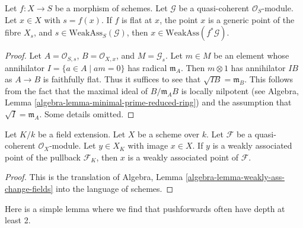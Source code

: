 \begin{lemma}
\label{lemma-weakly-ass-pullback}
Let $f : X \to S$ be a morphism of schemes. Let $\mathcal{G}$ be a
quasi-coherent $\mathcal{O}_S$-module. Let $x \in X$ with $s = f(x)$.
If $f$ is flat at $x$, the point $x$ is a generic point of the fibre $X_s$, and
$s \in \text{WeakAss}_S(\mathcal{G})$, then
$x \in \text{WeakAss}(f^*\mathcal{G})$.
\end{lemma}

\begin{proof}
Let $A = \mathcal{O}_{S, s}$, $B = \mathcal{O}_{X, x}$, and
$M = \mathcal{G}_s$. Let $m \in M$ be an element whose annihilator
$I = \{a \in A \mid am = 0\}$ has radical $\mathfrak m_A$. Then
$m \otimes 1$ has annihilator $I B$ as $A \to B$ is
faithfully flat. Thus it suffices to see that $\sqrt{I B} = \mathfrak m_B$.
This follows from the fact that the maximal ideal of $B/\mathfrak m_AB$
is locally nilpotent (see
Algebra, Lemma \ref{algebra-lemma-minimal-prime-reduced-ring})
and the assumption that $\sqrt{I} = \mathfrak m_A$.
Some details omitted.
\end{proof}

\begin{lemma}
\label{lemma-weakly-ass-change-fields}
Let $K/k$ be a field extension. Let $X$ be a scheme over $k$.
Let $\mathcal{F}$ be a quasi-coherent $\mathcal{O}_X$-module.
Let $y \in X_K$ with image $x \in X$. If $y$ is a weakly
associated point of the pullback $\mathcal{F}_K$, then $x$
is a weakly associated point of $\mathcal{F}$.
\end{lemma}

\begin{proof}
This is the translation of
Algebra, Lemma \ref{algebra-lemma-weakly-ass-change-fields}
into the language of schemes.
\end{proof}

\noindent
Here is a simple lemma where we find that pushforwards often have
depth at least 2.

